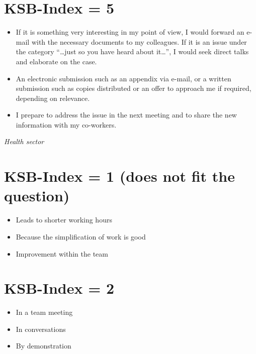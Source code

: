 \documentclass[twocolumn, serif, empirical, authordate]{jote-article}
\begin{document}
\section*{KSB-Index = 5}
\label{sec:KSB-Index = 5}

\begin{itemize} \item If it is something very interesting in my point of view, I would forward an e-mail with the necessary documents to my colleagues. If it is an issue under the category ``\ldots just so you have heard about it\ldots'', I would seek direct talks and elaborate on the case.
\item An electronic submission such as an appendix via e-mail, or a written submission such as copies distributed or an offer to approach me if required, depending on relevance.
\item I prepare to address the issue in the next meeting and to share the new information with my co-workers.
\end{itemize} 
\emph{Health sector} 

\section*{KSB-Index = 1 (does not fit the question)}
\label{sec:KSB-Index = 1 (does not fit the question)}

\begin{itemize} \item Leads to shorter working hours \item Because the simplification of work is good \item Improvement within the team \end{itemize} 

\section*{KSB-Index = 2}
\label{sec:KSB-Index = 2}

\begin{itemize} \item In a team meeting \item In conversations \item By demonstration \end{itemize} 

\end{document}
